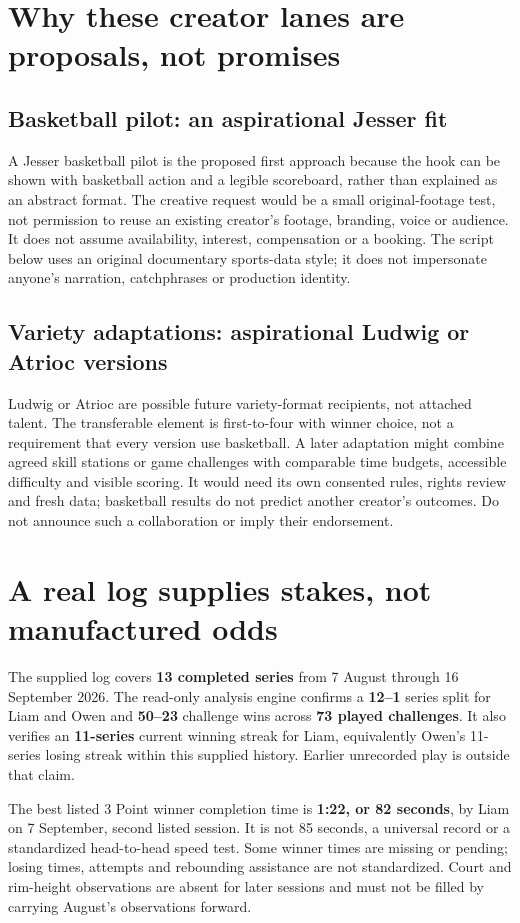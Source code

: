 \documentclass[11pt]{article}
\begin{document}
\section{Why these creator lanes are proposals, not promises}
\subsection{Basketball pilot: an aspirational Jesser fit}
A Jesser basketball pilot is the proposed first approach because the hook can
be shown with basketball action and a legible scoreboard, rather than explained
as an abstract format. The creative request would be a small original-footage
test, not permission to reuse an existing creator's footage, branding, voice or
audience. It does not assume availability, interest, compensation or a booking.
The script below uses an original documentary sports-data style; it does not
impersonate anyone's narration, catchphrases or production identity.

\subsection{Variety adaptations: aspirational Ludwig or Atrioc versions}
Ludwig or Atrioc are possible future variety-format recipients, not attached
talent. The transferable element is first-to-four with winner choice, not a
requirement that every version use basketball. A later adaptation might combine
agreed skill stations or game challenges with comparable time budgets, accessible
difficulty and visible scoring. It would need its own consented rules, rights
review and fresh data; basketball results do not predict another creator's
outcomes. Do not announce such a collaboration or imply their endorsement.

\section{A real log supplies stakes, not manufactured odds}
The supplied log covers \textbf{13 completed series} from 7 August through
16 September 2026. The read-only analysis engine confirms a \textbf{12--1}
series split for Liam and Owen and \textbf{50--23} challenge wins across
\textbf{73 played challenges}. It also verifies an \textbf{11-series} current
winning streak for Liam, equivalently Owen's 11-series losing streak within
this supplied history. Earlier unrecorded play is outside that claim.

The best listed 3 Point winner completion time is \textbf{1:22, or 82 seconds},
by Liam on 7 September, second listed session. It is not 85 seconds, a universal
record or a standardized head-to-head speed test. Some winner times are missing
or pending; losing times, attempts and rebounding assistance are not standardized.
Court and rim-height observations are absent for later sessions and must not be
filled by carrying August's observations forward.
\end{document}
